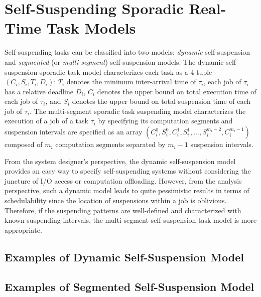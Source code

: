 \section{Self-Suspending Sporadic Real-Time Task Models}
  
Self-suspending tasks can be classified into two models: \emph{dynamic} self-suspension and \emph{segmented} (or \emph{multi-segment}) self-suspension models. 
The dynamic self-suspension sporadic task model characterizes each task as a $4$-tuple $(C_i,S_i,T_i,D_i)$: $T_i$ denotes the minimum inter-arrival time of $\tau_i$, each job of $\tau_i$ has a relative deadline $D_i$,
$C_i$ denotes the upper bound on total execution time of each job of $\tau_i$,
and $S_i$ denotes the upper bound on total suspension time of each job of $\tau_i$. The multi-segment sporadic task suspending model characterizes the execution of a job of a task $\tau_i$ by  specifying its computation segments and suspension intervals are specified as an array
$(C_{i}^0,S_{i}^0,C_{i}^1,S_{i}^1,...,S_{i}^{m_i-2},C_{i}^{m_i-1})$ composed of $m_i$ computation segments separated by $m_i-1$ suspension intervals. 

From the system designer's perspective, the dynamic self-suspension model provides an easy way to specify self-suspending systems without considering the juncture of I/O access or computation offloading. 
However, from the analysis perspective, such a  dynamic model leads to quite pessimistic results in terms of schedulability since the location of suspensions within a job is oblivious. Therefore, if the suspending patterns are well-defined and characterized with known suspending intervals, the multi-segment self-suspension task model is more appropriate.   

\subsection{Examples of Dynamic Self-Suspension Model} 

\subsection{Examples of Segmented Self-Suspension Model} 
  
  
  